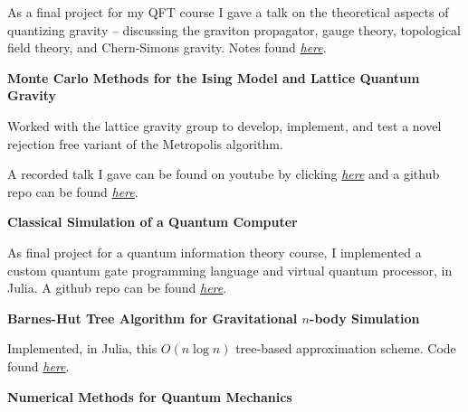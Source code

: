 \documentclass[9pt]{extarticle}
\begin{document}
\begin{compactitem}
\item As a final project for my QFT course I gave a talk on the theoretical aspects of quantizing gravity -- discussing the graviton propagator, gauge theory, topological field theory, and Chern-Simons gravity. Notes found \href{https://aarontrowbridge.github.io/notes/}{\textit{here}}.
\end{compactitem}


\vspace{2.5pt}
\large\textbf{Monte Carlo Methods for the Ising Model and Lattice Quantum Gravity}
\normalsize

\begin{compactitem}
\item Worked with the lattice gravity group to develop, implement, and test a novel rejection free variant of the Metropolis algorithm. 
\item A recorded talk I gave can be found on youtube by clicking \href{https://www.youtube.com/watch?v=_Ppx0e3aG-E&t=2s}{\textit{here}} and a github repo can be found \href{https://github.com/aarontrowbridge/Ising}{\textit{here}}.
\end{compactitem}

\vspace{2.5pt}
\large\textbf{Classical Simulation of a Quantum Computer}
\normalsize

\begin{compactitem}
\item As final project for a quantum information theory course, I implemented a custom quantum gate programming language and virtual quantum processor, in Julia. A github repo can be found \href{https://github.com/aarontrowbridge/QuIPS}{\textit{here}}.
\end{compactitem}


\vspace{2.5pt}
\large\textbf{Barnes-Hut Tree Algorithm for Gravitational $n$-body Simulation}
\normalsize

\begin{compactitem}
\item Implemented, in Julia, this $O(n \log n)$ tree-based approximation scheme. Code found \href{https://github.com/aarontrowbridge/Gravity}{\textit{here}}. 
\end{compactitem}


\vspace{2.5pt}
\large\textbf{Numerical Methods for Quantum Mechanics}
\normalsize
\end{document}
